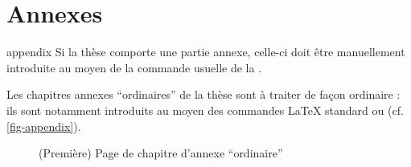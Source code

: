 \chapter{Annexes}\label{cha-annexes}
%

\begin{docCommand}{appendix}{}
  Si la thèse comporte une partie annexe, celle-ci doit être manuellement
  introduite au moyen de la commande usuelle  de la
  \nofrontmatter.
\end{docCommand}

Les chapitres annexes \enquote{ordinaires} de la thèse sont à traiter de façon
ordinaire : ils sont notamment introduits au moyen des commandes \LaTeX{}
standard  ou  (cf.
\vref{fig-appendix}).

\begin{figure}[htbp]
  \centering
  \caption[Chapitre d'annexe \enquote{ordinaire}]{(Première) Page de chapitre
    d'annexe \enquote{ordinaire}}
  \label{fig-appendix}
\end{figure}

